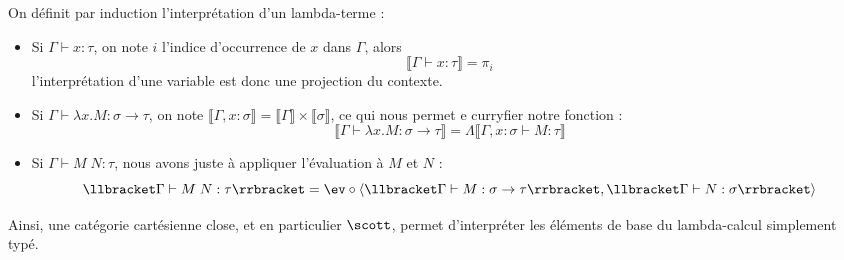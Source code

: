 \begin{defi}[Interprétation]
    On définit par induction l'interprétation d'un lambda-terme :
    \begin{itemize}[label=$\bullet$]
        \item Si $\Gamma\vdash x : \tau$, on note $i$ l'indice d'occurrence de $x$ dans $\Gamma$, alors $$\llbracket\Gamma\vdash x : \tau\rrbracket = \pi_i$$ l'interprétation d'une variable est donc une projection du contexte.
        \item Si $\Gamma\vdash \lambda x.M : \sigma\to\tau$, on note $\llbracket\Gamma,x : \sigma\rrbracket=\llbracket\Gamma\rrbracket\times \llbracket\sigma\rrbracket$, ce qui nous permet e curryfier notre fonction :
        $$\llbracket\Gamma\vdash\lambda x.M : \sigma\to\tau\rrbracket=\Lambda\llbracket\Gamma,x : \sigma\vdash M : \tau\rrbracket$$
        \item Si $\Gamma\vdash M\;N : \tau$, nous avons juste à appliquer l'évaluation à $M$ et $N$ :
        $$\llbracket\Gamma\vdash M\;N : \tau\rrbracket = \ev\circ\langle\llbracket\Gamma\vdash M : \sigma\to\tau\rrbracket,\llbracket\Gamma\vdash N : \sigma\rrbracket\rangle$$
    \end{itemize}
\end{defi}

Ainsi, une catégorie cartésienne close, et en particulier $\scott$, permet d'interpréter les éléments de base du lambda-calcul simplement typé.

\newpage